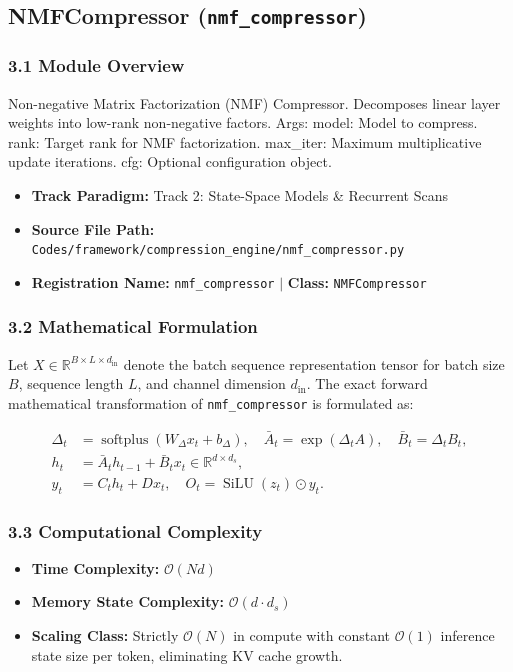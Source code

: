 \subsection{NMFCompressor (\texttt{nmf\_compressor})}
\label{sec:app_module_nmf_compressor}

\subsubsection*{3.1 Module Overview}
Non-negative Matrix Factorization (NMF) Compressor. Decomposes linear layer weights into low-rank non-negative factors.  Args:     model: Model to compress.     rank: Target rank for NMF factorization.     max\_iter: Maximum multiplicative update iterations.     cfg: Optional configuration object.
\begin{itemize}
    \item \textbf{Track Paradigm:} Track 2: State-Space Models & Recurrent Scans
    \item \textbf{Source File Path:} \texttt{Codes/framework/compression\_engine/nmf\_compressor.py}
    \item \textbf{Registration Name:} \texttt{nmf\_compressor} $\mid$ \textbf{Class:} \texttt{NMFCompressor}
\end{itemize}

\subsubsection*{3.2 Mathematical Formulation}
Let $X \in \mathbb{R}^{B \times L \times d_{\text{in}}}$ denote the batch sequence representation tensor for batch size $B$, sequence length $L$, and channel dimension $d_{\text{in}}$. The exact forward mathematical transformation of \texttt{nmf\_compressor} is formulated as:

\begin{align}
\Delta_t &= \operatorname{softplus}(W_\Delta x_t + b_\Delta), \quad \bar{A}_t = \exp(\Delta_t A), \quad \bar{B}_t = \Delta_t B_t, \\
h_t &= \bar{A}_t h_{t-1} + \bar{B}_t x_t \in \mathbb{R}^{d \times d_s}, \\
y_t &= C_t h_t + D x_t, \quad O_t = \operatorname{SiLU}(z_t) \odot y_t.
\end{align}


\subsubsection*{3.3 Computational Complexity}
\begin{itemize}
    \item \textbf{Time Complexity:} $\mathcal{O}(N d)$
    \item \textbf{Memory State Complexity:} $\mathcal{O}(d \cdot d_s)$
    \item \textbf{Scaling Class:} Strictly $\mathcal{O}(N)$ in compute with constant $\mathcal{O}(1)$ inference state size per token, eliminating KV cache growth.
\end{itemize}

